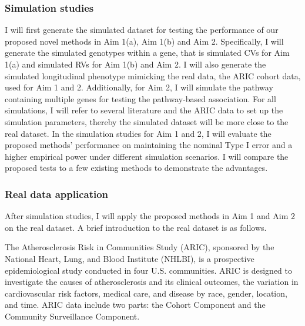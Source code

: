 \documentclass[12pt]{article}
\begin{document}
\subsubsection{Simulation studies}
I will first generate the simulated dataset for testing the performance of our proposed novel methods in Aim 1(a), Aim 1(b) and Aim 2. Specifically, I will generate the simulated genotypes within a gene, that is simulated CVs for Aim 1(a) and simulated RVs for Aim 1(b) and Aim 2. I will also generate the simulated longitudinal phenotype mimicking the real data, the ARIC cohort data, used for Aim 1 and 2. Additionally, for Aim 2, I will simulate the pathway containing multiple genes for testing the pathway-based association. For all simulations, I will refer to several literature \cite{pan2014powerful,Basu2011,Pan2011,Han2010,Pan2009} and the ARIC data to set up the simulation parameters, thereby the simulated dataset will be more close to the real dataset. %
In the simulation studies for Aim 1 and 2, I will evaluate the proposed methods' performance on maintaining the nominal Type I error and a higher empirical power under different simulation scenarios. I will compare the proposed tests to a few existing methods to demonstrate the advantages.

\subsubsection{Real data application}
After simulation studies, I will apply the proposed methods in Aim 1 and Aim 2 on the real dataset. A brief introduction to the real dataset is as follows.

The Atherosclerosis Risk in Communities Study (ARIC), sponsored by the National Heart, Lung, and Blood Institute (NHLBI), is a prospective epidemiological study conducted in four U.S. communities. ARIC is designed to investigate the causes of atherosclerosis and its clinical outcomes, the variation in cardiovascular risk factors, medical care, and disease by race, gender, location, and time. ARIC data include two parts: the Cohort Component and the Community Surveillance Component.
\end{document}
